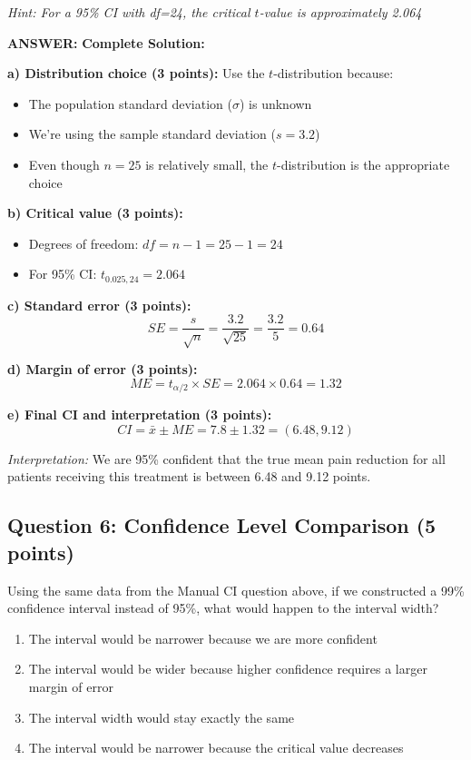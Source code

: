 \documentclass[11pt]{article}
\newcommand{\answer}[1]{\par\vspace{0.3em}\colorbox{green!10}{\parbox{\dimexpr\textwidth-2\fboxsep}{\textbf{ANSWER:} #1}}\vspace{0.3em}\par}
\begin{document}
\textit{Hint: For a 95\% CI with df=24, the critical $t$-value is approximately 2.064}

\answer{\textbf{Complete Solution:}

\textbf{a) Distribution choice (3 points):} Use the $t$-distribution because:
\begin{itemize}
\item The population standard deviation ($\sigma$) is unknown
\item We're using the sample standard deviation ($s = 3.2$)
\item Even though $n = 25$ is relatively small, the $t$-distribution is the appropriate choice
\end{itemize}

\textbf{b) Critical value (3 points):}
\begin{itemize}
\item Degrees of freedom: $df = n - 1 = 25 - 1 = 24$
\item For 95\% CI: $t_{0.025, 24} = 2.064$
\end{itemize}

\textbf{c) Standard error (3 points):}
$$SE = \frac{s}{\sqrt{n}} = \frac{3.2}{\sqrt{25}} = \frac{3.2}{5} = 0.64$$

\textbf{d) Margin of error (3 points):}
$$ME = t_{\alpha/2} \times SE = 2.064 \times 0.64 = 1.32$$

\textbf{e) Final CI and interpretation (3 points):}
$$CI = \bar{x} \pm ME = 7.8 \pm 1.32 = (6.48, 9.12)$$

\textit{Interpretation:} We are 95\% confident that the true mean pain reduction for all patients receiving this treatment is between 6.48 and 9.12 points.}

\subsection*{Question 6: Confidence Level Comparison (5 points)}

Using the same data from the Manual CI question above, if we constructed a 99\% confidence interval instead of 95\%, what would happen to the interval width?

\begin{enumerate}[label=\alph*)]
\item The interval would be narrower because we are more confident
\item The interval would be wider because higher confidence requires a larger margin of error
\item The interval width would stay exactly the same
\item The interval would be narrower because the critical value decreases
\end{enumerate}
\end{document}
